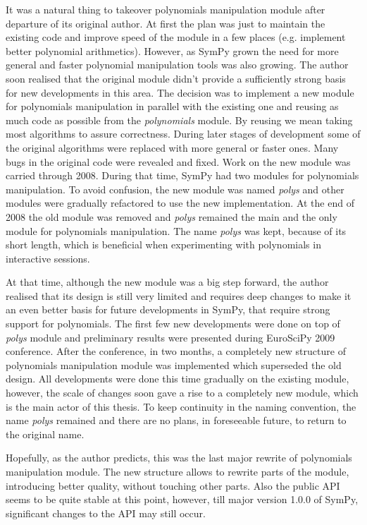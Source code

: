 It was a natural thing to takeover polynomials manipulation module after departure of its original
author. At first the plan was just to maintain the existing code and improve speed of the module in
a few places (e.g. implement better polynomial arithmetics). However, as SymPy grown the need for
more general and faster polynomial manipulation tools was also growing. The author soon realised that
the original module didn't provide a sufficiently strong basis for new developments in this area. The
decision was to implement a new module for polynomials manipulation in parallel with the existing one
and reusing as much code as possible from the \emph{polynomials} module. By reusing we mean taking most
algorithms to assure correctness. During later stages of development some of the original algorithms
were replaced with more general or faster ones.  Many bugs in the original code were revealed and fixed.
Work on the new module was carried through 2008. During that time, SymPy had two modules for polynomials
manipulation. To avoid confusion, the new module was named \emph{polys} and other modules were gradually
refactored to use the new implementation.  At the end of 2008 the old module was removed and \emph{polys}
remained the main and the only module for polynomials manipulation. The name \emph{polys} was kept, because
of its short length, which is beneficial when experimenting with polynomials in interactive sessions.

At that time, although the new module was a big step forward, the author realised that its design is
still very limited and requires deep changes to make it an even better basis for future developments
in SymPy, that require strong support for polynomials. The first few new developments were done on
top of \emph{polys} module and preliminary results were presented during EuroSciPy 2009 conference. After
the conference, in two months, a completely new structure of polynomials manipulation module was
implemented which superseded the old design. All developments were done this time gradually on the
existing module, however, the scale of changes soon gave a rise to a completely new module, which
is the main actor of this thesis. To keep continuity in the naming convention, the name \emph{polys}
remained and there are no plans, in foreseeable future, to return to the original name.

Hopefully, as the author predicts, this was the last major rewrite of polynomials manipulation module.
The new structure allows to rewrite parts of the module, introducing better quality, without touching
other parts. Also the public API seems to be quite stable at this point, however, till major version
1.0.0 of SymPy, significant changes to the API may still occur.


